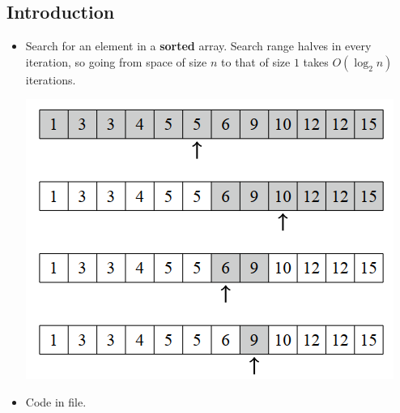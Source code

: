 \documentclass{article}
\newcommand{\B}[1]{\textbf{#1}}
\begin{document}
\begin{sloppypar}
    \subsection{Introduction}
    \begin{itemize}
        \item Search for an element in a \B{sorted} array. Search range halves in every iteration, so going from space of size $n$ to that of size $1$ takes $O(\log_2 n)$ iterations.
        \begin{center}
            \includegraphics[width = 0.5\linewidth]{../images/bin-search.png}
        \end{center}
        \item Code in file.
    \end{itemize}


\end{sloppypar}
\end{document}
